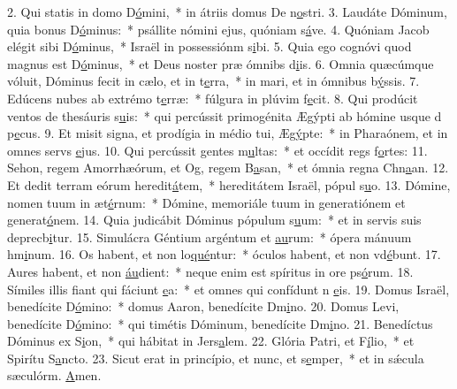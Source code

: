 2. Qui statis in domo D\uline{ó}mini,~* in átriis domus De n\uline{o}stri.
3. Laudáte Dóminum, quia bonus D\uline{ó}minus:~* psállite nómini ejus, quóniam s\uline{á}ve.
4. Quóniam Jacob elégit sibi D\uline{ó}minus,~* Israël in possessiónm s\uline{i}bi.
5. Quia ego cognóvi quod magnus est D\uline{ó}minus,~* et Deus noster præ ómnibs d\uline{i}is.
6. Omnia quæcúmque vóluit, Dóminus fecit in cælo, et in t\uline{e}rra,~* in mari, et in ómnibus b\uline{ý}ssis.
7. Edúcens nubes ab extrémo t\uline{e}rræ:~* fúlgura in plúvim f\uline{e}cit.
8. Qui prodúcit ventos de thesáuris s\uline{u}is:~* qui percússit primogénita Ægýpti ab hómine usque d p\uline{e}cus.
9. Et misit signa, et prodígia in médio tui, Æg\uline{ý}pte:~* in Pharaónem, et in omnes servs \uline{e}jus.
10. Qui percússit gentes m\uline{u}ltas:~* et occídit regs f\uline{o}rtes:
11. Sehon, regem Amorrhæórum, et Og, regem B\uline{a}san,~* et ómnia regna Chn\uline{a}an.
12. Et dedit terram eórum heredit\uline{á}tem,~* hereditátem Israël, pópul s\uline{u}o.
13. Dómine, nomen tuum in æt\uline{é}rnum:~* Dómine, memoriále tuum in generatiónem et generat\uline{ó}nem.
14. Quia judicábit Dóminus pópulum s\uline{u}um:~* et in servis suis deprecb\uline{i}tur.
15. Simulácra Géntium argéntum et \uline{au}rum:~* ópera mánuum hm\uline{i}num.
16. Os habent, et non lo\uline{qué}ntur:~* óculos habent, et non vd\uline{é}bunt.
17. Aures habent, et non \uline{áu}dient:~* neque enim est spíritus in ore ps\uline{ó}rum.
18. Símiles illis fiant qui fáciunt \uline{e}a:~* et omnes qui confídunt n \uline{e}is.
19. Domus Israël, benedícite D\uline{ó}mino:~* domus Aaron, benedícite Dm\uline{i}no.
20. Domus Levi, benedícite D\uline{ó}mino:~* qui timétis Dóminum, benedícite Dm\uline{i}no.
21. Benedíctus Dóminus ex S\uline{i}on,~* qui hábitat in Jers\uline{a}lem.
22. Glória Patri, et F\uline{í}lio,~* et Spirítu S\uline{a}ncto.
23. Sicut erat in princípio, et nunc, et s\uline{e}mper,~* et in sǽcula sæculórm. \uline{A}men.
